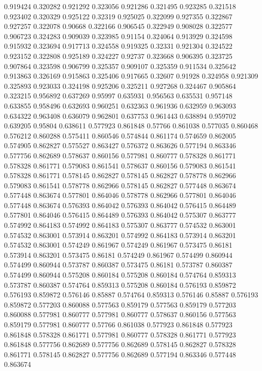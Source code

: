 0.919424 0.320282
0.921292 0.323056
0.921286 0.321495
0.923285 0.321518
0.923402 0.320329
0.925122 0.32319
0.925025 0.322099
0.927355 0.322867
0.927257 0.322078
0.90668 0.322166
0.906545 0.322949
0.908028 0.322577
0.906723 0.324283
0.909039 0.323985
0.91154 0.324064
0.913929 0.324598
0.915932 0.323694
0.917713 0.324558
0.919325 0.32331
0.921304 0.324522
0.923152 0.322808
0.925189 0.324227
0.92737 0.323668
0.906395 0.323725
0.907864 0.323598
0.906799 0.325357
0.909107 0.325359
0.911534 0.325642
0.913863 0.326169
0.915863 0.325406
0.917665 0.32607
0.91928 0.324958
0.921309 0.325893
0.923033 0.324198
0.925206 0.325211
0.927268 0.324467
0.905864 0.323215
0.956892 0.637269
0.95997 0.635931
0.956563 0.635531
0.957148 0.633855
0.958496 0.632693
0.960251 0.632363
0.961936 0.632959
0.963093 0.634322
0.963408 0.636079
0.962801 0.637753
0.961443 0.638894
0.959702 0.639205
0.95804 0.638611
0.577923 0.861848
0.57766 0.861038
0.577035 0.860468
0.576212 0.860288
0.575411 0.860546
0.574844 0.861174
0.574659 0.862005
0.574905 0.862827
0.575527 0.863427
0.576372 0.863626
0.577194 0.863346
0.577756 0.862689
0.578637 0.860156
0.577981 0.860777
0.578328 0.861771
0.578328 0.861771
0.579083 0.861541
0.578637 0.860156
0.579083 0.861541
0.578328 0.861771
0.578145 0.862827
0.578145 0.862827
0.578778 0.862966
0.579083 0.861541
0.578778 0.862966
0.578145 0.862827
0.577448 0.863674
0.577448 0.863674
0.577801 0.864046
0.578778 0.862966
0.577801 0.864046
0.577448 0.863674
0.576393 0.864042
0.576393 0.864042
0.576415 0.864489
0.577801 0.864046
0.576415 0.864489
0.576393 0.864042
0.575307 0.863777
0.574992 0.864183
0.574992 0.864183
0.575307 0.863777
0.574532 0.863001
0.574532 0.863001
0.573914 0.863201
0.574992 0.864183
0.573914 0.863201
0.574532 0.863001
0.574249 0.861967
0.574249 0.861967
0.573475 0.86181
0.573914 0.863201
0.573475 0.86181
0.574249 0.861967
0.574499 0.860944
0.574499 0.860944
0.573787 0.860387
0.573475 0.86181
0.573787 0.860387
0.574499 0.860944
0.575208 0.860184
0.575208 0.860184
0.574764 0.859313
0.573787 0.860387
0.574764 0.859313
0.575208 0.860184
0.576193 0.859872
0.576193 0.859872
0.576146 0.85887
0.574764 0.859313
0.576146 0.85887
0.576193 0.859872
0.577203 0.860088
0.577563 0.859179
0.577563 0.859179
0.577203 0.860088
0.577981 0.860777
0.577981 0.860777
0.578637 0.860156
0.577563 0.859179
0.577981 0.860777
0.57766 0.861038
0.577923 0.861848
0.577923 0.861848
0.578328 0.861771
0.577981 0.860777
0.578328 0.861771
0.577923 0.861848
0.577756 0.862689
0.577756 0.862689
0.578145 0.862827
0.578328 0.861771
0.578145 0.862827
0.577756 0.862689
0.577194 0.863346
0.577448 0.863674
